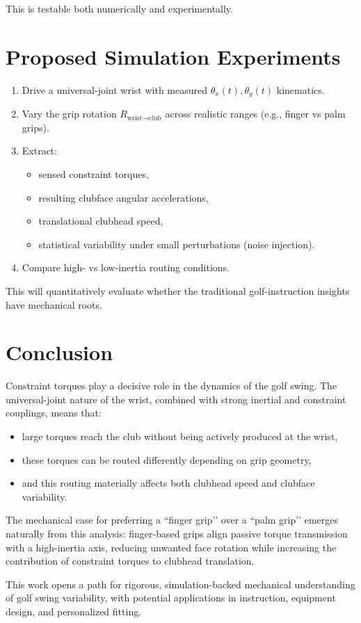 \documentclass[11pt]{article}
\begin{document}
This is testable both numerically and experimentally.

\section{Proposed Simulation Experiments}

\begin{enumerate}
    \item Drive a universal-joint wrist with measured $\theta_x(t),\theta_y(t)$ kinematics.
    \item Vary the grip rotation $R_{\text{wrist}\to\text{club}}$ across realistic ranges 
    (e.g., finger vs palm grips).
    \item Extract:
    \begin{itemize}
        \item sensed constraint torques,
        \item resulting clubface angular accelerations,
        \item translational clubhead speed,
        \item statistical variability under small perturbations (noise injection).
    \end{itemize}
    \item Compare high- vs low-inertia routing conditions.
\end{enumerate}

This will quantitatively evaluate whether the traditional golf-instruction insights have mechanical roots.

\section{Conclusion}

Constraint torques play a decisive role in the dynamics of the golf swing.  
The universal-joint nature of the wrist, combined with strong inertial and constraint couplings, 
means that:
\begin{itemize}
    \item large torques reach the club without being actively produced at the wrist,
    \item these torques can be routed differently depending on grip geometry,
    \item and this routing materially affects both clubhead speed and clubface variability.
\end{itemize}

The mechanical case for preferring a ``finger grip’’ over a ``palm grip’’ emerges naturally 
from this analysis: finger-based grips align passive torque transmission with a high-inertia axis, 
reducing unwanted face rotation while increasing the contribution of constraint torques to clubhead translation.

This work opens a path for rigorous, simulation-backed mechanical understanding of golf swing variability, 
with potential applications in instruction, equipment design, and personalized fitting.
\end{document}
